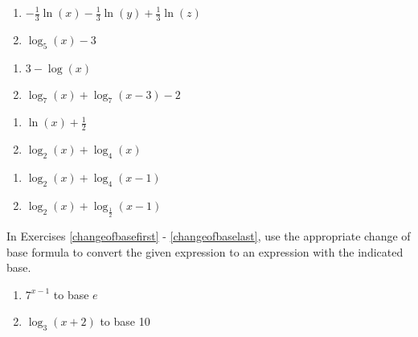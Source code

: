 \begin{multicols}{2}
\begin{enumerate}
\setcounter{enumi}{\value{HW}}

\item $-\frac{1}{3} \ln(x) - \frac{1}{3}\ln(y) + \frac{1}{3} \ln(z)$
\item $\log_{5}(x) - 3$

\setcounter{HW}{\value{enumi}}
\end{enumerate}
\end{multicols}

\begin{multicols}{2}
\begin{enumerate}
\setcounter{enumi}{\value{HW}}

\item $3 - \log(x)$
\item $\log_{7}(x) + \log_{7}(x - 3) - 2$

\setcounter{HW}{\value{enumi}}
\end{enumerate}
\end{multicols}

\begin{multicols}{2}
\begin{enumerate}
\setcounter{enumi}{\value{HW}}

\item $\ln(x) + \frac{1}{2}$ 
\item $\log_{2}(x) + \log_{4}(x)$ 

\setcounter{HW}{\value{enumi}}
\end{enumerate}
\end{multicols}

\begin{multicols}{2}
\begin{enumerate}
\setcounter{enumi}{\value{HW}}

\item $\log_{2}(x) + \log_{4}(x-1)$
\item $\log_{2}(x) + \log_{\frac{1}{2}}(x - 1)$ \label{combineloglast}

\setcounter{HW}{\value{enumi}}
\end{enumerate}
\end{multicols}

\pagebreak

In Exercises \ref{changeofbasefirst} - \ref{changeofbaselast}, use the appropriate change of base formula to convert the given expression to an expression with the indicated base. 

\begin{multicols}{2}
\begin{enumerate}
\setcounter{enumi}{\value{HW}}

\item $7^{x - 1}$ to base $e$ \label{changeofbasefirst}
\item $\log_{3}(x + 2)$ to base 10

\setcounter{HW}{\value{enumi}}
\end{enumerate}
\end{multicols}

